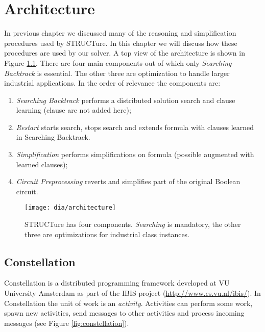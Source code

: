 \chapter{Architecture}
\label{chap:architecture}

In previous chapter we discussed many of the reasoning and
simplification procedures used by STRUCTure. In this chapter we will
discuss how these procedures are used by our solver.  A top view of
the architecture is shown in Figure \ref{fig:architecture}. There are
four main components out of which only \emph{Searching Backtrack}
is essential.  The other three are optimization to handle larger
industrial applications. In the order of relevance the components
are:

\begin{enumerate}
  \item \emph{Searching Backtrack} performs a distributed solution search
  and clause learning (clause are not added here);
  \item \emph{Restart} starts search, stops search and extends
  formula with clauses learned in Searching Backtrack.
  \item \emph{Simplification} performs simplifications on formula (possible
  augmented with learned clauses);
  \item \emph{Circuit Preprocessing} reverts and simplifies 
  part of the original Boolean circuit.
\end{enumerate}

\begin{figure}
  \centering
  \texttt{[image: dia/architecture]}
  \caption{STRUCTure has four components. \emph{Searching}
  is mandatory, the other three are optimizations
  for industrial class instances.}
  \label{fig:architecture}
\end{figure}


\section{Constellation}
\label{sec:constellation}

Constellation is a distributed programming framework developed at
VU University Amsterdam \cite{mine:constellation} as part of the
IBIS project (\url{http://www.cs.vu.nl/ibis/}).  In Constellation
the unit of work is an \emph{activity}. Activities can perform some work,
spawn new activities, send messages to other activities and process
incoming messages (see Figure \ref{fig:constellation}).

